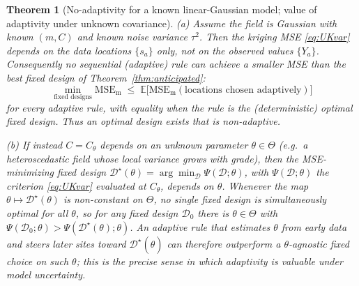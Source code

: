 \documentclass{amsart}
\newtheorem{theorem}{Theorem}
\theoremstyle{definition}
\newcommand{\E}{\mathbb{E}}
\begin{document}
\begin{theorem}[No-adaptivity for a known linear-Gaussian model; value of
adaptivity under unknown covariance]
\label{thm:adaptive}
\textup{(a)} Assume the field is Gaussian with \emph{known} $(m,C)$ and
known noise variance $\tau^2$. Then the kriging MSE \eqref{eq:UKvar}
depends on the data locations $\{s_a\}$ \emph{only}, not on the observed
values $\{Y_a\}$. Consequently no sequential (adaptive) rule can achieve a
smaller MSE than the best fixed design of Theorem~\ref{thm:anticipated}:
\[
\min_{\text{fixed designs}}\mathrm{MSE}_{\mathrm m}
\;\le\;
\E\big[\mathrm{MSE}_{\mathrm m}(\text{locations chosen adaptively})\big]
\]
for every adaptive rule, with equality when the rule is the (deterministic)
optimal fixed design. Thus an optimal design exists that is non-adaptive.

\textup{(b)} If instead $C=C_\theta$ depends on an unknown parameter
$\theta\in\Theta$ (e.g.\ a heteroscedastic field whose local variance grows
with grade), then the MSE-minimizing fixed design
$\mathcal D^\star(\theta)=\arg\min_{\mathcal D}\Psi(\mathcal D;\theta)$,
with $\Psi(\mathcal D;\theta)$ the criterion \eqref{eq:UKvar} evaluated at
$C_\theta$, depends on $\theta$. Whenever the map
$\theta\mapsto\mathcal D^\star(\theta)$ is non-constant on $\Theta$, no
single fixed design is simultaneously optimal for all $\theta$, so for any
fixed design $\mathcal D_0$ there is $\theta\in\Theta$ with
$\Psi(\mathcal D_0;\theta)>\Psi(\mathcal D^\star(\theta);\theta)$. An
adaptive rule that estimates $\theta$ from early data and steers later
sites toward $\mathcal D^\star(\widehat\theta)$ can therefore outperform a
$\theta$-agnostic fixed choice on such $\theta$; this is the precise sense
in which adaptivity is valuable under model uncertainty.
\end{theorem}
\end{document}
